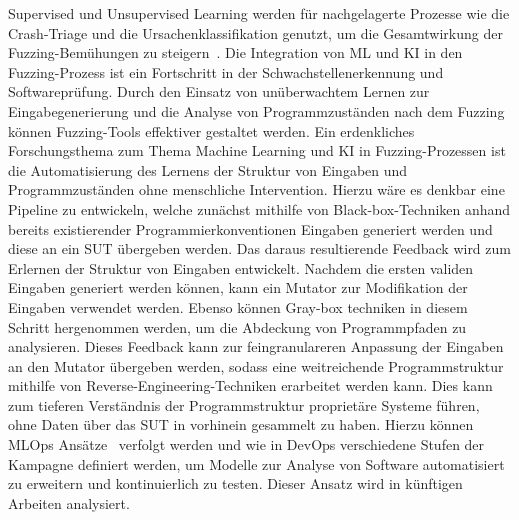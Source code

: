 Supervised und Unsupervised Learning werden für nachgelagerte Prozesse wie die Crash-Triage und die Ursachenklassifikation
genutzt, um die Gesamtwirkung der Fuzzing-Bemühungen zu steigern~\cite{saavedra_review_2019}.\newline
Die Integration von ML und KI in den Fuzzing-Prozess ist ein Fortschritt in der Schwachstellenerkennung und
Softwareprüfung.
Durch den Einsatz von unüberwachtem Lernen zur Eingabegenerierung und die Analyse von Programmzuständen nach dem Fuzzing
können Fuzzing-Tools effektiver gestaltet werden.
Ein erdenkliches Forschungsthema zum Thema Machine Learning und KI in Fuzzing-Prozessen ist die Automatisierung des Lernens
der Struktur von Eingaben und Programmzuständen ohne menschliche Intervention.
Hierzu wäre es denkbar eine Pipeline zu entwickeln, welche zunächst mithilfe von Black-box-Techniken anhand bereits existierender
Programmierkonventionen Eingaben generiert werden und diese an ein SUT übergeben werden.
Das daraus resultierende Feedback wird zum Erlernen der Struktur von Eingaben entwickelt.
Nachdem die ersten validen Eingaben generiert werden können, kann ein Mutator zur Modifikation der Eingaben verwendet werden.
Ebenso können Gray-box techniken in diesem Schritt hergenommen werden, um die Abdeckung von Programmpfaden zu analysieren.
Dieses Feedback kann zur feingranulareren Anpassung der Eingaben an den Mutator übergeben werden, sodass eine weitreichende
Programmstruktur mithilfe von Reverse-Engineering-Techniken erarbeitet werden kann.
Dies kann zum tieferen Verständnis der Programmstruktur proprietäre Systeme führen, ohne Daten über das SUT in vorhinein
gesammelt zu haben.
Hierzu können MLOps Ansätze~\cite{kreuzberger_machine_2023} verfolgt werden und wie in DevOps verschiedene Stufen der Kampagne definiert werden, um
Modelle zur Analyse von Software automatisiert zu erweitern und kontinuierlich zu testen.
Dieser Ansatz wird in künftigen Arbeiten analysiert.
